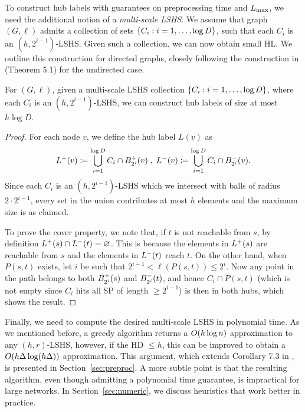 To construct hub labels with guarantees on preprocessing time and $\Lm$, we need the additional notion of a \emph{multi-scale LSHS}. 
We assume that graph $(G,\ell)$ admits a collection of sets $\crl*{C_i: i=1,\ldots,\log D}$, such that each $C_i$ is an $(h,2^{i-1})$-LSHS.
Given such a collection, we can now obtain small HL.
We outline this construction for directed graphs, closely following the construction in \cite{highway2013} (Theorem 5.1) for the undirected case.
\begin{proposition}
\label{theo:construct_hl}
For $(G,\ell)$, given a multi-scale LSHS collection $\crl*{C_i:i=1,\ldots,\log D}$, where each $C_i$ is an $(h,2^{i-1})$-LSHS, we can construct hub labels of size at most $h\log D$.
\end{proposition}
\begin{proof}
For each node $v$, we define the hub label $L(v)$ as
\begin{align*}
\Lf(v)\defeq  \bigcup_{i=1}^{\log D}C_i\cap \Bf_{2^i}(v)\;,\;
\Lb(v)\defeq \bigcup_{i=1}^{\log D}C_i\cap \Bb_{2^i}(v).
\end{align*}
Since each $C_i$ is an $(h,2^{i-1})$-LSHS which we intersect with balls of radius $2\cdot 2^{i-1}$, every set in the union contributes at most $h$ elements and the maximum size is as claimed.

To prove the cover property, we note that, if $t$ is not reachable from $s$, by definition $\Lf(s)\cap\Lb(t)=\varnothing$.
This is because the elements in $\Lf(s)$ are reachable from $s$ and the elements in $\Lb(t)$ reach $t$.
On the other hand, when $P(s,t)$ exists, let $i$ be such that $2^{i-1}<\ell(P(s,t))\leq 2^i$.
Now any point in the path belongs to both $\Bf_{2^i}(s)$ and $\Bb_{2^i}(t)$, and hence $C_i\cap P(s,t)$  (which is not empty since $C_i$ hits all SP of length $\geq 2^{i-1}$) is then in both hubs, which shows the result.
\end{proof}


Finally, we need to compute the desired multi-scale LSHS in polynomial time.
As we mentioned before, a greedy algorithm returns a $\Or(h\log n)$ approximation to any $(h,r)$-LSHS, however, if the HD $\leq h$, this can be improved to obtain a $\Or(h\Delta\log(h\Delta))$ approximation.
This argument, which extends Corollary 7.3 in \cite{highway2013}, is presented in Section~\ref{sec:preproc}.
A more subtle point is that the resulting algorithm, even though admitting a polynomial time guarantee, is impractical for large networks.
In Section~\ref{sec:numeric}, we discuss heuristics that work better in practice.